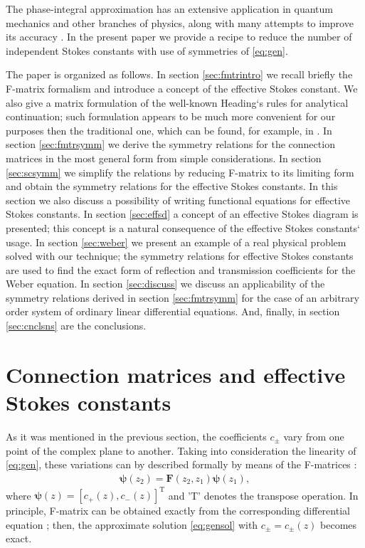 \documentclass[atmp]{ipart_v1}
\def\psii{\bm\psi}
\def\F{\bm{F}}
\def\T{\mathrm{T}}
\newcommand\eref[1]{\eqref{#1}}
\newcommand\sref[1]{section \ref{#1}}
\begin{document}
The phase-integral approximation has an extensive application in quantum mechanics and other 
branches of physics, along with many attempts to improve its accuracy
\cite{ours,dunham,dingle73,berry90,berry91,sergeenko96,delabaere97,sergeenko02,mirnov10,poor16,esposito09,aleixo00}. 
In the present paper we provide a recipe to reduce the number 
of independent Stokes constants with use of symmetries of \eref{eq:gen}. 

The paper is organized as follows. 
In \sref{sec:fmtrintro} we recall briefly the F-matrix formalism and introduce a concept of the 
effective Stokes constant. We also give a matrix formulation of the well-known Heading`s rules for
analytical continuation; such formulation appears to be much more convenient for our purposes then 
the traditional one, which can be found, for example, in \cite{rwbook}.
In \sref{sec:fmtrsymm} we derive the symmetry relations for the connection matrices in the most
general form from simple considerations.
In \sref{sec:scsymm} we simplify the relations by reducing F-matrix to its limiting form and
obtain the symmetry relations for the effective Stokes constants. In this section we also discuss
a possibility of writing functional equations for effective Stokes constants.
In \sref{sec:effsd} a concept of an effective Stokes diagram is presented; this concept is a natural
consequence of the effective Stokes constants` usage.
In \sref{sec:weber} we present an example of a real physical problem solved with our technique; 
the symmetry relations for effective Stokes constants are used to find the exact 
form of reflection and transmission coefficients for the Weber equation. 
In \sref{sec:discuss} we discuss an applicability of the symmetry relations derived in \sref{sec:fmtrsymm}
for the case of an arbitrary order system of ordinary linear differential equations.
And, finally, in \sref{sec:cnclsns} are the conclusions. 













\section{Connection matrices and effective Stokes constants \label{sec:fmtrintro}}
As it was mentioned in the previous section, the coefficients $c_\pm$ 
vary from one point of the complex plane to another. Taking into consideration
the linearity of \eref{eq:gen}, these variations can by described formally by means 
of the F-matrices \cite{frbook}:
\begin{eqnarray}
\psii(z_2) = \F(z_2,z_1) \psii(z_1),
\label{eq:fmtrdef}
\end{eqnarray}
where $\psii(z) = [{c_+(z),c_-(z)}]^{\T}$ and 'T' denotes the transpose operation.
In principle, F-matrix can be obtained exactly from the corresponding differential 
equation \cite{frbook}; then, the approximate solution \eref{eq:gensol} 
with $c_\pm=c_\pm(z)$ becomes exact.  
\end{document}
